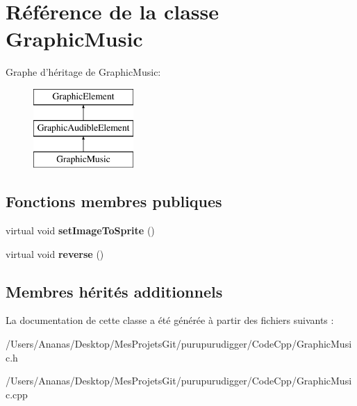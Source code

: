 \hypertarget{class_graphic_music}{\section{Référence de la classe Graphic\-Music}
\label{class_graphic_music}
}
Graphe d'héritage de Graphic\-Music\-:\begin{figure}[H]
\begin{center}
\leavevmode
\includegraphics[height=3.000000cm]{class_graphic_music}
\end{center}
\end{figure}
\subsection*{Fonctions membres publiques}
\begin{DoxyCompactItemize}
\item 
\hypertarget{class_graphic_music_a0528a4869bf1d97b2b7e0a7f8b0029f1}{virtual void {\bfseries set\-Image\-To\-Sprite} ()}\label{class_graphic_music_a0528a4869bf1d97b2b7e0a7f8b0029f1}

\item 
\hypertarget{class_graphic_music_af3f690eaed25bdd2e5598a6f6ad5558c}{virtual void {\bfseries reverse} ()}\label{class_graphic_music_af3f690eaed25bdd2e5598a6f6ad5558c}

\end{DoxyCompactItemize}
\subsection*{Membres hérités additionnels}


La documentation de cette classe a été générée à partir des fichiers suivants \-:\begin{DoxyCompactItemize}
\item 
/\-Users/\-Ananas/\-Desktop/\-Mes\-Projets\-Git/purupurudigger/\-Code\-Cpp/Graphic\-Music.\-h\item 
/\-Users/\-Ananas/\-Desktop/\-Mes\-Projets\-Git/purupurudigger/\-Code\-Cpp/Graphic\-Music.\-cpp\end{DoxyCompactItemize}
